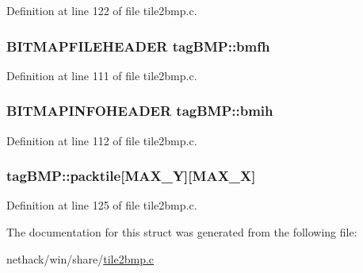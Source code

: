 Definition at line 122 of file tile2bmp.\+c.

\hypertarget{structtagBMP_a9ce1c9030e45eecb49eda04a971894b5}{
\subsubsection[{bmfh}]{\setlength{\rightskip}{0pt plus 5cm}B\+I\+T\+M\+A\+P\+F\+I\+L\+E\+H\+E\+A\+D\+E\+R tag\+B\+M\+P\+::bmfh}}\label{structtagBMP_a9ce1c9030e45eecb49eda04a971894b5}


Definition at line 111 of file tile2bmp.\+c.

\hypertarget{structtagBMP_ae18d33e2f0d66ddeed35c319535909f6}{
\subsubsection[{bmih}]{\setlength{\rightskip}{0pt plus 5cm}B\+I\+T\+M\+A\+P\+I\+N\+F\+O\+H\+E\+A\+D\+E\+R tag\+B\+M\+P\+::bmih}}\label{structtagBMP_ae18d33e2f0d66ddeed35c319535909f6}


Definition at line 112 of file tile2bmp.\+c.

\hypertarget{structtagBMP_a916a722d033afc6cecb658ebe53b7da6}{
\subsubsection[{packtile}]{ tag\+B\+M\+P\+::packtile\mbox{[}{\bf M\+A\+X\+\_\+\+Y}\mbox{]}\mbox{[}{\bf M\+A\+X\+\_\+\+X}\mbox{]}}}\label{structtagBMP_a916a722d033afc6cecb658ebe53b7da6}


Definition at line 125 of file tile2bmp.\+c.



The documentation for this struct was generated from the following file\+:\begin{DoxyCompactItemize}
\item 
nethack/win/share/\hyperlink{tile2bmp_8c}{tile2bmp.\+c}\end{DoxyCompactItemize}
